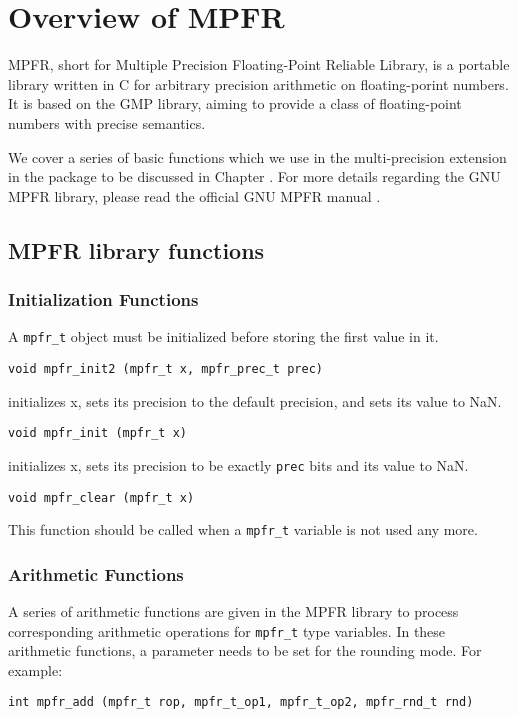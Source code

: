 
\chapter{Overview of MPFR}\label{ch:mpfr}
MPFR, short for  Multiple Precision Floating-Point Reliable Library, is a portable library written in C for arbitrary precision arithmetic on floating-porint numbers. It is based on the GMP library, aiming to provide a class of floating-point numbers with precise semantics.

We cover a series of basic functions which we use in the multi-precision extension in the \FADBADpp package to be discussed in Chapter . For more details regarding the GNU MPFR library, please read the official GNU MPFR manual \cite{MPFRman}.


\section{MPFR library functions}
\subsection{Initialization Functions}
A {\tt mpfr\_t} object must be initialized before storing the first value in it.
\begin{center}
\texttt{void mpfr\_init2 (mpfr\_t x, mpfr\_prec\_t prec)}
\end{center}
initializes x, sets its precision to the default precision, and sets its value to NaN.
\begin{center}
	\texttt{void mpfr\_init (mpfr\_t x)}
\end{center}
initializes x, sets its precision to be exactly \texttt{prec} bits and its value to NaN.
\begin{center}
	\texttt{void mpfr\_clear (mpfr\_t x)}
\end{center}
This function should be called when a {\tt mpfr\_t} variable is not used any more.
\subsection{Arithmetic Functions}
A series of arithmetic functions are given in the MPFR library to process corresponding arithmetic operations for {\tt mpfr\_t} type variables. In these arithmetic functions, a parameter needs to be set for the rounding mode. For example:

\texttt{int mpfr\_add (mpfr\_t rop, mpfr\_t\_op1, mpfr\_t\_op2, mpfr\_rnd\_t rnd)}

